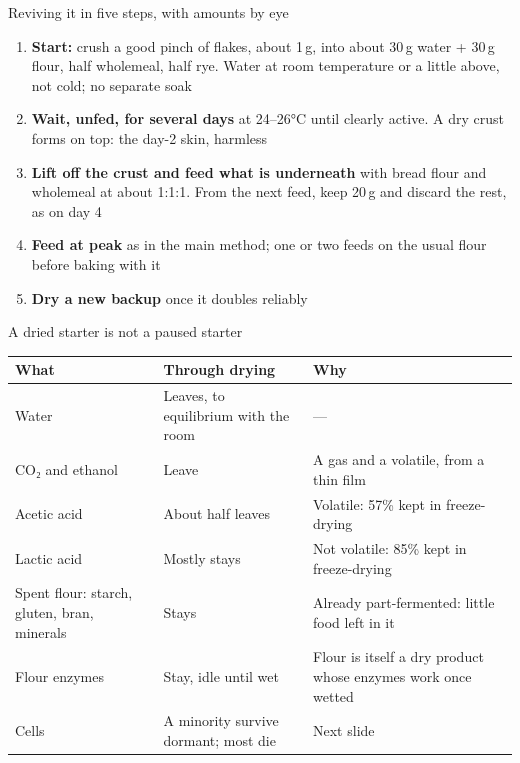 \documentclass[aspectratio=169,11pt]{beamer}
\begin{document}
\begin{frame}{Reviving it in five steps, with amounts by eye \ownresult}
  \small
  \begin{enumerate}\setlength{\itemsep}{1pt}
    \item \textbf{Start:} crush a good pinch of flakes, about 1\,g, into about 30\,g water + 30\,g flour, half wholemeal, half rye. Water at room temperature or a little above, not cold; no separate soak
    \item \textbf{Wait, unfed, for several days} at 24--26°C until clearly active. A dry crust forms on top: the day-2 skin, harmless
    \item \textbf{Lift off the crust and feed what is underneath} with bread flour and wholemeal at about 1:1:1. From the next feed, keep 20\,g and discard the rest, as on day 4
    \item \textbf{Feed at peak} as in the main method; one or two feeds on the usual flour before baking with it
    \item \textbf{Dry a new backup} once it doubles reliably
  \end{enumerate}
\end{frame}

\begin{frame}{A dried starter is not a paused starter}
  \footnotesize
  \renewcommand{\arraystretch}{0.92}
  \begin{tabularx}{\linewidth}{@{}>{\raggedright\arraybackslash}p{3.0cm} >{\raggedright\arraybackslash}p{5.5cm} >{\raggedright\arraybackslash}X@{}}
    \toprule
    \textbf{What} & \textbf{Through drying} & \textbf{Why} \\
    \midrule
    Water & Leaves, to equilibrium with the room & --- \\
    CO₂ and ethanol & Leave & A gas and a volatile, from a thin film \\
    Acetic acid & About half leaves & Volatile: 57\% kept in freeze-drying \\
    Lactic acid & Mostly stays & Not volatile: 85\% kept in freeze-drying \\
    Spent flour: starch, gluten, bran, minerals & Stays & Already part-fermented: little food left in it \\
    Flour enzymes & Stay, idle until wet & Flour is itself a dry product whose enzymes work once wetted \\
    Cells & A minority survive dormant; most die & Next slide \\
    \bottomrule
  \end{tabularx}
\end{frame}
\end{document}
